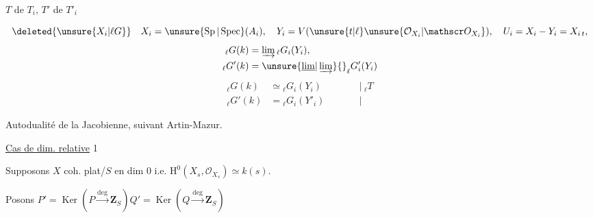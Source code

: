 {$T$ de $T_i$, $T'$ de $T'_i$

\[
\deleted{\unsure{X_i|\ell G}}\quad X_i=\unsure{\operatorname{Sp}|\operatorname{Spec}}(A_i),\quad Y_i=V(\unsure{t|\ell}\unsure{\mathcal O_{X_i}|\mathscr O_{X_i}}),\quad U_i=X_i-Y_i=X_{i\,t},
\]
\[
\begin{aligned}
{} _\ell G(k)&=\varinjlim {}_\ell G_i(Y_i),\\
{} _\ell G'(k)&=\unsure{\underline{\lim}|\varinjlim}{}_\ell G'_i(Y_i)
\end{aligned}
\]
\[
\begin{aligned}
{} _\ell G(k)&\simeq{} _\ell G_i(Y_i)&\qquad&\Big|\ {}_\ell T\\
{} _\ell G'(k)&={} _\ell G_i(Y'_i)&\qquad&\big|
\end{aligned}
\]
}

  

Autodualité de la Jacobienne, suivant Artin-Mazur.

\uline{Cas de dim. relative} 1

Supposons  $X$ coh. plat/$S$ en dim $0$ i.e. $\mathrm H^0(X_s,\mathcal O_{X_s})\simeq k(s)$.

Posons $P'=\operatorname{Ker}(P\xrightarrow{\deg}\mathbf Z_S)$\qquad $Q'=\operatorname{Ker}(Q\xrightarrow{\deg}\mathbf Z_S)$

